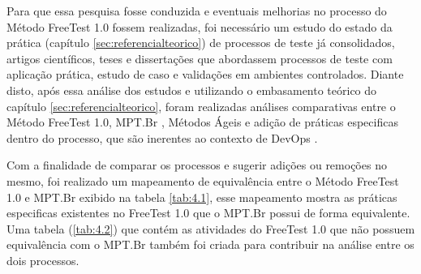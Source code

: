 Para que essa pesquisa fosse conduzida e eventuais melhorias no processo do Método FreeTest 1.0 fossem realizadas, foi necessário um estudo do estado da prática (capítulo \ref{sec:referencialteorico}) de processos de teste já consolidados, artigos científicos, teses e dissertações que abordassem processos de teste com aplicação prática, estudo de caso e validações em ambientes controlados. Diante disto, após essa análise dos estudos e utilizando o embasamento teórico do capítulo \ref{sec:referencialteorico}, foram realizadas análises comparativas entre o Método FreeTest 1.0, MPT.Br \cite{GuiaMPTbr}, Métodos Ágeis \cite{Beck2001} e adição de práticas especificas dentro do processo, que são inerentes ao contexto de DevOps \cite{Debois2008}. 

Com a finalidade de comparar os processos e sugerir adições ou remoções no mesmo, foi realizado um mapeamento de equivalência entre o Método FreeTest 1.0 e MPT.Br exibido na tabela \ref{tab:4.1}, esse mapeamento mostra as práticas especificas existentes no FreeTest 1.0 que o MPT.Br possui de forma equivalente. Uma tabela (\ref{tab:4.2}) que contém as atividades do FreeTest 1.0 que não possuem equivalência com o MPT.Br também foi criada para contribuir na análise entre os dois processos.

